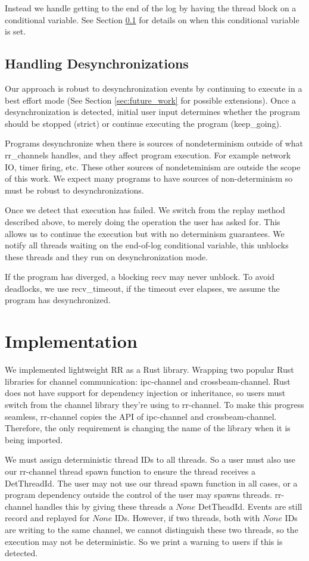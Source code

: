 \documentclass{article}
\begin{document}
Instead we handle getting to the end of the log by having the thread block on a conditional
variable. See Section \ref{sec:handle_desync} for details on when this conditional variable
is set.

\subsection{Handling Desynchronizations}
\label{sec:handle_desync}
Our approach is robust to desynchronization events by continuing to execute in
a best effort mode (See Section \ref{sec:future_work} for possible extensions).
Once a desynchronization is detected, initial user input determines whether the
program should be stopped (strict) or continue executing the program (keep\_going).

Programs desynchronize when there is sources of nondeterminism outside of what rr\_channels
handles, and they affect program execution. For example network IO, timer firing, etc. These
other sources of nondeteminism are outside the scope of this work. We expect many
programs to have sources of non-determinism so must be robust to desynchronizations.

Once we detect that execution has failed. We switch from the replay method described
above, to merely doing the operation the user has asked for. This allows us to
continue the execution but with no determinism guarantees. We notify all threads
waiting on the end-of-log conditional variable, this unblocks these threads and
they run on desynchronization mode.

If the program has diverged, a blocking recv may never unblock. To avoid deadlocks,
we use recv\_timeout, if the timeout ever elapses, we assume the program has desynchronized.

\section{Implementation}
We implemented lightweight RR as a Rust library. Wrapping two popular Rust libraries
for channel communication: ipc-channel and crossbeam-channel. Rust does not have
support for dependency injection or inheritance, so users must switch from the channel
library they're using to rr-channel. To make this progress seamless, rr-channel copies
the API of ipc-channel and crossbeam-channel. Therefore, the only requirement is changing
the name of the library when it is being imported.

We must assign deterministic thread IDs to all threads. So a user must also use our
rr-channel thread spawn function to ensure the thread receives a DetThreadId. The
user may not use our thread spawn function in all cases, or a program dependency outside the
control of the user may spawns threads. rr-channel handles this by giving these threads
a $None$ DetTheadId. Events are still record and replayed for $None$ IDs. However, if two
threads, both with $None$ IDs are writing to the same channel, we cannot distinguish these
two threads, so the execution may not be deterministic. So we print a warning to users if
this is detected.
\end{document}

